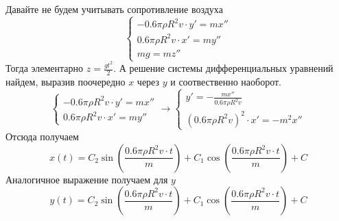 \documentclass[a5paper, 10pt]{article}
\theoremstyle{definition}
\theoremstyle{plain}
\theoremstyle{remark}
\begin{document}
Давайте не будем учитывать сопротивление воздуха
\begin{equation}
\begin{cases}
  - 0.6 \pi \rho  R^{2} v  \cdot  y' = m x''\\
    0.6 \pi \rho  R^{2} v  \cdot   x'  = m y''\\
m g  = m z''
\end{cases}
\end{equation}
Тогда элементарно $ z = \frac{gt^2}{2} $. А решение системы дифференциальных уравнений найдем, выразив поочередно  $x$ через $y$ и соотвественно наоборот.
\begin{equation}
\begin{cases}
  - 0.6 \pi \rho  R^{2} v  \cdot  y' = m x''\\
    0.6 \pi \rho  R^{2} v  \cdot   x'  = m y''
\end{cases}
\to
\begin{cases}
    y' = - \frac{m x''}{ 0.6 \pi \rho  R^{2} v}\\
    \left(0.6 \pi \rho  R^{2} v \right)^2 \cdot   x'  = -m^2x''
\end{cases}
\end{equation}
Отсюда получаем
\begin{equation}
x(t) = C_2 \sin \left(\frac{0.6 \pi \rho  R^{2} v \cdot t}{m} \right) +  C_1 \cos \left(\frac{0.6 \pi \rho  R^{2} v \cdot t}{m} \right) + C
\end{equation}
Аналогичное выражение получаем для $y$
\begin{equation}
y(t) = C_2 \sin \left(\frac{0.6 \pi \rho  R^{2} v \cdot t}{m} \right) +  C_1 \cos \left(\frac{0.6 \pi \rho  R^{2} v \cdot t}{m} \right) + C
\end{equation}
\end{document}
